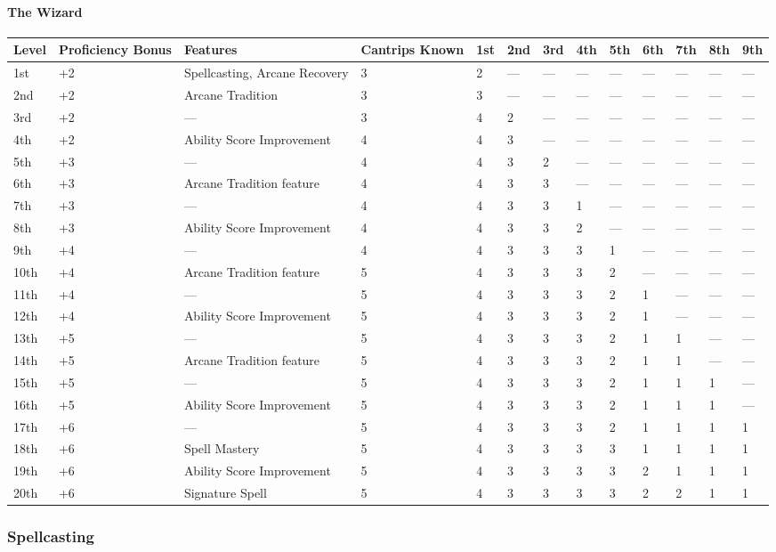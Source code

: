 \documentclass[
]{article}
\begin{document}
\hypertarget{the-wizard}{%
\paragraph{The Wizard}\label{the-wizard}}

\begin{longtable}[]{@{}lllllllllllll@{}}
\toprule
Level & Proficiency Bonus & Features & Cantrips Known & 1st & 2nd & 3rd
& 4th & 5th & 6th & 7th & 8th & 9th\tabularnewline
\midrule
\endhead
1st & +2 & Spellcasting, Arcane Recovery & 3 & 2 & --- & --- & --- & ---
& --- & --- & --- & ---\tabularnewline
2nd & +2 & Arcane Tradition & 3 & 3 & --- & --- & --- & --- & --- & ---
& --- & ---\tabularnewline
3rd & +2 & --- & 3 & 4 & 2 & --- & --- & --- & --- & --- & --- &
---\tabularnewline
4th & +2 & Ability Score Improvement & 4 & 4 & 3 & --- & --- & --- & ---
& --- & --- & ---\tabularnewline
5th & +3 & --- & 4 & 4 & 3 & 2 & --- & --- & --- & --- & --- &
---\tabularnewline
6th & +3 & Arcane Tradition feature & 4 & 4 & 3 & 3 & --- & --- & --- &
--- & --- & ---\tabularnewline
7th & +3 & --- & 4 & 4 & 3 & 3 & 1 & --- & --- & --- & --- &
---\tabularnewline
8th & +3 & Ability Score Improvement & 4 & 4 & 3 & 3 & 2 & --- & --- &
--- & --- & ---\tabularnewline
9th & +4 & --- & 4 & 4 & 3 & 3 & 3 & 1 & --- & --- & --- &
---\tabularnewline
10th & +4 & Arcane Tradition feature & 5 & 4 & 3 & 3 & 3 & 2 & --- & ---
& --- & ---\tabularnewline
11th & +4 & --- & 5 & 4 & 3 & 3 & 3 & 2 & 1 & --- & --- &
---\tabularnewline
12th & +4 & Ability Score Improvement & 5 & 4 & 3 & 3 & 3 & 2 & 1 & ---
& --- & ---\tabularnewline
13th & +5 & --- & 5 & 4 & 3 & 3 & 3 & 2 & 1 & 1 & --- &
---\tabularnewline
14th & +5 & Arcane Tradition feature & 5 & 4 & 3 & 3 & 3 & 2 & 1 & 1 &
--- & ---\tabularnewline
15th & +5 & --- & 5 & 4 & 3 & 3 & 3 & 2 & 1 & 1 & 1 & ---\tabularnewline
16th & +5 & Ability Score Improvement & 5 & 4 & 3 & 3 & 3 & 2 & 1 & 1 &
1 & ---\tabularnewline
17th & +6 & --- & 5 & 4 & 3 & 3 & 3 & 2 & 1 & 1 & 1 & 1\tabularnewline
18th & +6 & Spell Mastery & 5 & 4 & 3 & 3 & 3 & 3 & 1 & 1 & 1 &
1\tabularnewline
19th & +6 & Ability Score Improvement & 5 & 4 & 3 & 3 & 3 & 3 & 2 & 1 &
1 & 1\tabularnewline
20th & +6 & Signature Spell & 5 & 4 & 3 & 3 & 3 & 3 & 2 & 2 & 1 &
1\tabularnewline
\bottomrule
\end{longtable}

\hypertarget{spellcasting}{%
\subsubsection{Spellcasting}\label{spellcasting}}
\end{document}
